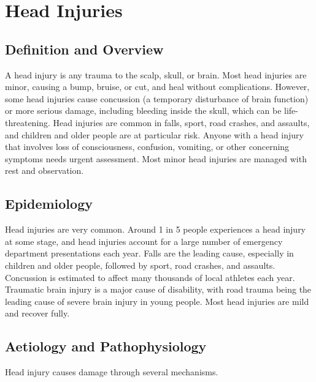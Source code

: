 \chapter{Head Injuries}

\section*{Definition and Overview}
A head injury is any trauma to the scalp, skull, or brain. Most head injuries are minor, causing a bump, bruise, or cut, and heal without complications. However, some head injuries cause concussion (a temporary disturbance of brain function) or more serious damage, including bleeding inside the skull, which can be life-threatening. Head injuries are common in falls, sport, road crashes, and assaults, and children and older people are at particular risk. Anyone with a head injury that involves loss of consciousness, confusion, vomiting, or other concerning symptoms needs urgent assessment. Most minor head injuries are managed with rest and observation.

\section*{Epidemiology}
Head injuries are very common. Around 1 in 5 people experiences a head injury at some stage, and head injuries account for a large number of emergency department presentations each year. Falls are the leading cause, especially in children and older people, followed by sport, road crashes, and assaults. Concussion is estimated to affect many thousands of local athletes each year. Traumatic brain injury is a major cause of disability, with road trauma being the leading cause of severe brain injury in young people. Most head injuries are mild and recover fully.

\section*{Aetiology and Pathophysiology}
Head injury causes damage through several mechanisms.

